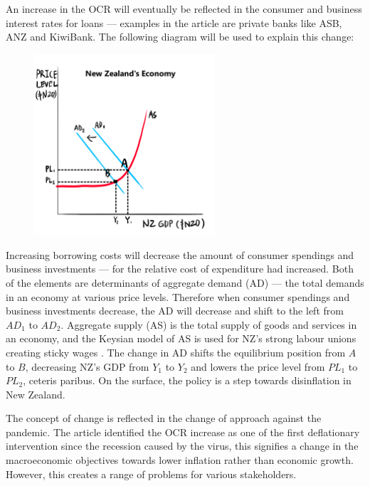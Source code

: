 \documentclass[a4paper,12pt]{article}
\begin{document}
An increase in the OCR will eventually be reflected in the consumer and business interest rates for loans --- examples in the article are private banks like ASB, ANZ and KiwiBank. The following diagram will be used to explain this change:

\begin{figure}[H]
    \centering
    \includegraphics[width=0.6\textwidth]{assets/macro.png}
\end{figure}

Increasing borrowing costs will decrease the amount of consumer spendings and business investments --- for the relative cost of expenditure had increased. Both of the elements are determinants of aggregate demand (AD) --- the total demands in an economy at various price levels. Therefore when consumer spendings and business investments decrease, the AD will decrease and shift to the left from $AD_1$ to $AD_2$. Aggregate supply (AS) is the total supply of goods and services in an economy, and the Keysian model of AS is used for NZ's strong labour unions creating sticky wages \parencite{labor}. The change in AD shifts the equilibrium position from $A$ to $B$, decreasing NZ's GDP from $Y_1$ to $Y_2$ and lowers the price level from $PL_1$ to $PL_2$, ceteris paribus. On the surface, the policy is a step towards disinflation in New Zealand.

The concept of change is reflected in the change of approach against the pandemic. The article identified the OCR increase as one of the first deflationary intervention since the recession caused by the virus, this signifies a change in the macroeconomic objectives towards lower inflation rather than economic growth. However, this creates a range of problems for various stakeholders.
\end{document}
